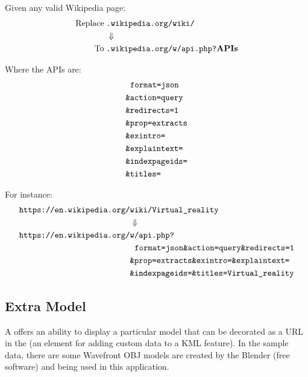 Given any valid Wikipedia page:
\[
\begin{array}{lr}
\begin{aligned}
\text{Replace}\;&\texttt{.wikipedia.org/wiki/}\\
&\Downarrow\\
\text{To}\;&\texttt{.wikipedia.org/w/api.php?}\mathbf{APIs}\\
\end{aligned}
\end{array}
\]

Where the APIs are:
\[
\begin{array}{lr}
\begin{aligned}
&\;\;\texttt{format=json}\\
&\texttt{\&action=query}\\
&\texttt{\&redirects=1}\\
&\texttt{\&prop=extracts}\\
&\texttt{\&exintro=}\\
&\texttt{\&explaintext=}\\
&\texttt{\&indexpageids=}\\
&\texttt{\&titles=}\\
\end{aligned}
\end{array}
\]

For instance:
\[
\begin{array}{lr}
\begin{aligned}
\texttt{https://en.wikipedia.org/}&\texttt{wiki/Virtual\_reality}\\
&\Downarrow\\
\texttt{https://en.wikipedia.org/}&\texttt{w/api.php?}\\
&\;\;\texttt{format=json\&action=query\&redirects=1}\\
&\texttt{\&prop=extracts\&exintro=\&explaintext=}\\
&\texttt{\&indexpageids=\&titles=Virtual\_reality}\\
\end{aligned}
\end{array}
\]

\subsection{Extra Model}
\label{section:obj-model}

A  offers an ability to display a particular model that can be decorated as a URL in the  (an element for adding custom data to a KML feature). In the sample data, there are some Wavefront OBJ models \cite{wiki.obj.2016} are created by the Blender (free software) and being used in this application.

